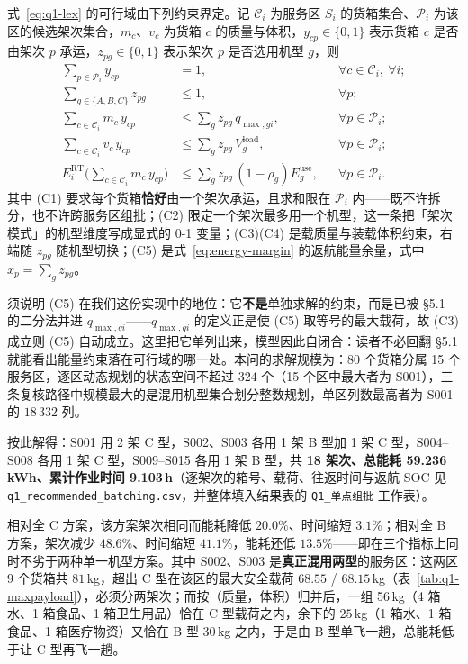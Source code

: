 式~\eqref{eq:q1-lex} 的可行域由下列约束界定。记 $\mathcal{C}_i$ 为服务区 $S_i$ 的货箱集合、$\mathcal{P}_i$ 为该区的候选架次集合，$m_c$、$v_c$ 为货箱 $c$ 的质量与体积，$y_{cp}\in\{0,1\}$ 表示货箱 $c$ 是否由架次 $p$ 承运，$z_{pg}\in\{0,1\}$ 表示架次 $p$ 是否选用机型 $g$，则
\begin{subequations}
	\label{eq:q1-cons}
	\begin{align}
		\sum_{p\in\mathcal{P}_i} y_{cp} &= 1, && \forall c\in\mathcal{C}_i,\ \forall i; \tag{C1}\label{eq:q1-c1}\\
		\sum_{g\in\{A,B,C\}} z_{pg} &\le 1, && \forall p; \tag{C2}\label{eq:q1-c2}\\
		\sum_{c\in\mathcal{C}_i} m_c\,y_{cp} &\le \sum_{g} z_{pg}\,q_{\max,gi}, && \forall p\in\mathcal{P}_i; \tag{C3}\label{eq:q1-c3}\\
		\sum_{c\in\mathcal{C}_i} v_c\,y_{cp} &\le \sum_{g} z_{pg}\,V^{\mathrm{load}}_{g}, && \forall p\in\mathcal{P}_i; \tag{C4}\label{eq:q1-c4}\\
		E_i^{\mathrm{RT}}\Big(\sum_{c\in\mathcal{C}_i} m_c\,y_{cp}\Big) &\le \sum_{g} z_{pg}\,(1-\rho_g)E_g^{\mathrm{use}}, && \forall p\in\mathcal{P}_i. \tag{C5}\label{eq:q1-c5}
	\end{align}
\end{subequations}
其中 (C1) 要求每个货箱\textbf{恰好}由一个架次承运，且求和限在 $\mathcal{P}_i$ 内——既不许拆分，也不许跨服务区组批；(C2) 限定一个架次最多用一个机型，这一条把「架次模式」的机型维度写成显式的 0-1 变量；(C3)(C4) 是载质量与装载体积约束，右端随 $z_{pg}$ 随机型切换；(C5) 是式~\eqref{eq:energy-margin} 的返航能量余量，式中 $x_p=\sum_g z_{pg}$。

须说明 (C5) 在我们这份实现中的地位：它\textbf{不是}单独求解的约束，而是已被 §5.1 的二分法并进 $q_{\max,gi}$——$q_{\max,gi}$ 的定义正是使 (C5) 取等号的最大载荷，故 (C3) 成立则 (C5) 自动成立。这里把它单列出来，模型因此自闭合：读者不必回翻 §5.1 就能看出能量约束落在可行域的哪一处。本问的求解规模为：80 个货箱分属 15 个服务区，逐区动态规划的状态空间不超过 $324$ 个（15 个区中最大者为 S001），三条复核路径中规模最大的是混用机型集合划分整数规划，单区列数最高者为 S001 的 $18\,332$ 列。

按此解得：S001 用 2 架 C 型，S002、S003 各用 1 架 B 型加 1 架 C 型，S004--S008 各用 1 架 C 型，S009--S015 各用 1 架 B 型，共 \textbf{18 架次、总能耗 59.236\,kWh、累计作业时间 9.103\,h}（逐架次的箱号、载荷、往返时间与返航 SOC 见 \texttt{q1\_recommended\_batching.csv}，并整体填入结果表的 \texttt{Q1\_单点组批} 工作表）。

相对全 C 方案，该方案架次相同而能耗降低 $20.0\%$、时间缩短 $3.1\%$；相对全 B 方案，架次减少 $48.6\%$、时间缩短 $41.1\%$，能耗还低 $13.5\%$——即在三个指标上同时不劣于两种单一机型方案。其中 S002、S003 是\textbf{真正混用两型}的服务区：这两区 9 个货箱共 $81$\,kg，超出 C 型在该区的最大安全载荷 $68.55$ / $68.15$\,kg（表~\ref{tab:q1-maxpayload}），必须分两架次；而按（质量，体积）归并后，一组 56\,kg（4 箱水、1 箱食品、1 箱卫生用品）恰在 C 型载荷之内，余下的 $25$\,kg（1 箱水、1 箱食品、1 箱医疗物资）又恰在 B 型 $30$\,kg 之内，于是由 B 型单飞一趟，总能耗低于让 C 型再飞一趟。

